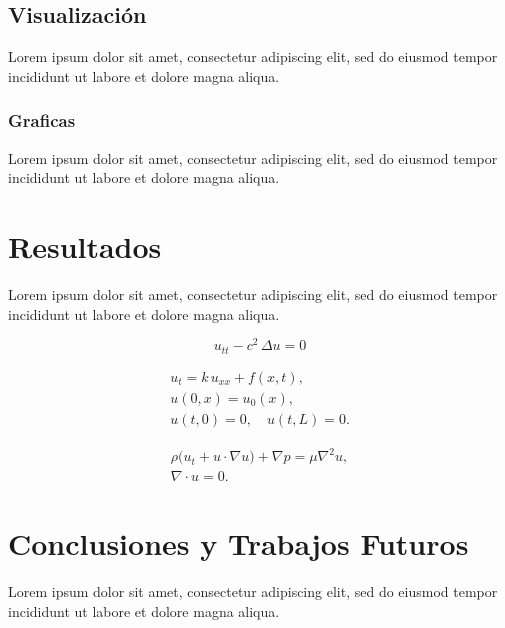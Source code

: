 \documentclass[12pt]{extarticle}
\numberwithin{equation}{section}
\begin{document}
\subsection{Visualización}
Lorem ipsum dolor sit amet, consectetur adipiscing elit, sed do eiusmod tempor incididunt ut labore et dolore magna aliqua.

\subsubsection{Graficas}
Lorem ipsum dolor sit amet, consectetur adipiscing elit, sed do eiusmod tempor incididunt ut labore et dolore magna aliqua.

\section{Resultados}
Lorem ipsum dolor sit amet, consectetur adipiscing elit, sed do eiusmod tempor incididunt ut labore et dolore magna aliqua.

\begin{equation}\label{eq:onda}
u_{tt} - c^2\,\Delta u = 0
\end{equation}

\begin{gather} %
  u_t = k\,u_{xx} + f(x,t), \label{eq:heat_b1} \\
  u(0,x) = u_0(x), \nonumber\\
  u(t,0) = 0,\quad u(t,L)=0. \label{eq:heat_b2}
\end{gather}

\begin{subequations}\label{eq:navier_stokes} %
\begin{gather} 
  \rho\bigl(u_t + u\cdot\nabla u\bigr) + \nabla p = \mu\nabla^2 u, \\
  \nabla\cdot u = 0.
\end{gather}
\end{subequations}


\section{Conclusiones y Trabajos Futuros}
Lorem ipsum dolor sit amet, consectetur adipiscing elit, sed do eiusmod tempor incididunt ut labore et dolore magna aliqua. \cite{}
\end{document}
